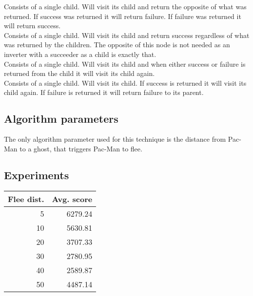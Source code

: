 Consists of a single child. Will visit its child and return the opposite of what was returned. If success was returned it will return failure. If failure was returned it will return success. \\

Consists of a single child. Will visit its child and return success regardless of what was returned by the children. The opposite of this node is not needed as an inverter with a succeeder as a child is exactly that. \\

Consists of a single child. Will visit its child and when either success or failure is returned from the child it will visit its child again. \\

Consists of a single child. Will visit its child. If success is returned it will visit its child again. If failure is returned it will return failure to its parent.

\subsection{Algorithm parameters}
The only algorithm parameter used for this technique is the distance from Pac-Man to a ghost, that triggers Pac-Man to flee. 



\subsection{Experiments}
\begin{tabular}{ | r | r | }
	\hline
	Flee dist. & Avg. score  \\ \hline
	5 & 6279.24  \\ \hline
	10 & 5630.81  \\ \hline
	20 & 3707.33  \\ \hline
	30 & 2780.95 \\ \hline
	40 & 2589.87 \\ \hline
	50 & 4487.14 \\
	\hline
\end{tabular}



























